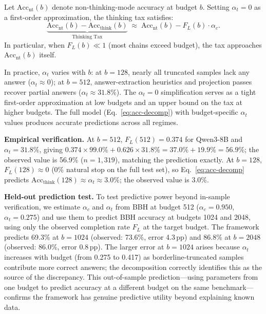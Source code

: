 \begin{proposition}
\label{thm:thinking-tax}
Let $\mathrm{Acc}_{\mathrm{nt}}(b)$ denote non-thinking-mode accuracy
at budget $b$.
Setting $\alpha_t = 0$ as a first-order approximation, the thinking tax
satisfies:
\begin{equation}
  \underbrace{\mathrm{Acc}_{\mathrm{nt}}(b)
    - \mathrm{Acc}_{\mathrm{think}}(b)}_{\text{Thinking Tax}}
  \;\approx\;
  \mathrm{Acc}_{\mathrm{nt}}(b) - F_L(b) \cdot \alpha_c.
  \label{eq:tax}
\end{equation}
In particular, when $F_L(b) \ll 1$ (most chains exceed budget), the
tax approaches $\mathrm{Acc}_{\mathrm{nt}}(b)$ itself.
\end{proposition}

\begin{remark}
\label{rem:alpha-t}
In practice, $\alpha_t$ varies with $b$: at $b{=}128$, nearly all
truncated samples lack any answer ($\alpha_t \approx 0$);
at $b{=}512$, answer-extraction heuristics and projection passes
recover partial answers ($\alpha_t \approx 31.8\%$).
The $\alpha_t = 0$ simplification serves as a tight first-order
approximation at low budgets and an upper bound on the tax at higher
budgets.
The full model (Eq.~\ref{eq:acc-decomp}) with budget-specific $\alpha_t$
values produces accurate predictions across all regimes.
\end{remark}

\noindent
\textbf{Empirical verification.}
At $b{=}512$, $F_L(512) = 0.374$ for Qwen3-8B and $\alpha_t = 31.8\%$, giving
$0.374 \times 99.0\% + 0.626 \times 31.8\% = 37.0\% + 19.9\% = 56.9\%$;
the observed value is 56.9\% ($n{=}1{,}319$), matching the prediction exactly.
At $b{=}128$, $F_L(128) \approx 0$ (0\% natural stop on the full test set), so
Eq.~\eqref{eq:acc-decomp} predicts $\mathrm{Acc}_{\mathrm{think}}(128) \approx \alpha_t \approx 3.0\%$;
the observed value is 3.0\%.

\noindent\textbf{Held-out prediction test.}
To test predictive power beyond in-sample verification, we estimate $\alpha_c$ and $\alpha_t$ from BBH at budget 512 ($\alpha_c{=}0.950$, $\alpha_t{=}0.275$) and use them to predict BBH accuracy at budgets 1024 and 2048, using only the observed completion rate $F_L$ at the target budget.
The framework predicts 69.3\% at $b{=}1024$ (observed: 73.6\%, error 4.3\,pp) and 86.8\% at $b{=}2048$ (observed: 86.0\%, error 0.8\,pp).
The larger error at $b{=}1024$ arises because $\alpha_t$ increases with budget (from 0.275 to 0.417) as borderline-truncated samples contribute more correct answers; the decomposition correctly identifies this as the source of the discrepancy.
This out-of-sample prediction---using parameters from one budget to predict accuracy at a different budget on the same benchmark---confirms the framework has genuine predictive utility beyond explaining known data.

